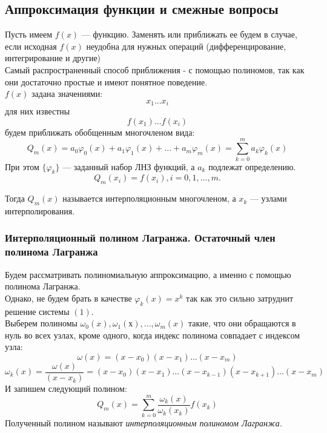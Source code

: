 \subsection{Аппроксимация функции и смежные вопросы}
Пусть имеем $f(x)$ --- функцию. Заменять или приближать ее будем 
в случае, если исходная $f(x)$ неудобна для нужных операций (дифференцирование,
интегрирование и другие)\\
Самый распространенный способ приближения - с помощью полиномов,
так как они достаточно простые и имеют понятное поведение.
\\

$f(x)$ задана значениями: 
\[
x_1 \dots x_i
\]
для них известны
\[
f(x_1) \dots f(x_i)
\]
будем приближать обобщенным многочленом вида:
\[
Q_m(x) = a_0\varphi_0(x) + a_1\varphi_1(x) + ... + a_m\varphi_m(x) = \sum_{k=0}^{m} a_k\varphi_k(x)
\]
При этом $\{\varphi_k\}$ --- заданный набор ЛНЗ функций, а $a_k$ подлежат определению.
\begin{equation}
    Q_m(x_i) = f(x_i), i=0,1,\dots,m.    
\end{equation}

Тогда $Q_m(x)$ называется интерполяционным многочленом, а $x_k$ --- узлами интерполирования.
\\
\subsubsection{Интерполяционный полином Лагранжа.
Остаточный член полинома Лагранжа}
Будем рассматривать полиномиальную аппроксимацию, а именно с помощью полинома Лагранжа.
\\

Однако, не будем брать в качестве
\( \varphi_k(x)=x^k \)
так как это сильно затруднит решение системы $(1)$.\\

Выберем полиномы $\omega_0(x), \omega_1(х), ... , \omega_m(x)$ такие, что они обращаются в нуль во всех узлах, кроме одного, когда
индекс полинома совпадает с индексом узла:
\[
\omega(x) = (x-x_0)(x-x_1)\dots(x-x_m)
\]
\[
\omega_k(x) = \frac{\omega(x)}{(x-x_k)} =(x-x_0)(x-x_1)\dots(x-x_{k-1})(x-x_{k+1})\dots(x-x_m) 
\]
И запишем следующий полином:
\[
Q_m(x) = \sum_{k=0}^{m} \frac{\omega_k(x)}{\omega_k(x_k)} f(x_k)
\]
Полученный полином называют \textit{интерполяционным полиномом Лагранжа.}